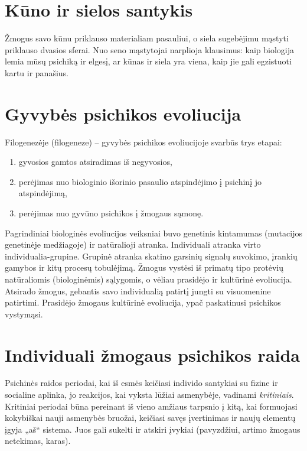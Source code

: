 \section{Kūno ir sielos santykis}

\label{tema:kuno_sielos_santykis}

Žmogus savo kūnu priklauso materialiam pasauliui, o siela sugebėjimu mąstyti
priklauso dvasios sferai. Nuo seno mąstytojai narplioja klausimus: kaip 
biologija lemia mūsų psichiką ir elgesį, ar kūnas ir siela yra viena, kaip 
jie gali egzistuoti kartu ir panašius.

\section{Gyvybės psichikos evoliucija}

\label{tema:gyvybes_psichikos_evoliucija}

Filogenezėje (\gls{filogeneze}) – gyvybės psichikos evoliucijoje svarbūs 
trys etapai: 
\begin{enumerate}
  \item gyvosios gamtos atsiradimas iš negyvosios,
  \item perėjimas nuo biologinio išorinio pasaulio atspindėjimo į psichinį 
    jo atspindėjimą,
  \item perėjimas nuo gyvūno psichikos į žmogaus sąmonę.
\end{enumerate}

Pagrindiniai biologinės evoliucijos veiksniai buvo genetinis kintamumas
(mutacijos genetinėje medžiagoje) ir natūralioji atranka. Individuali 
atranka virto individualia-grupine. Grupinė atranka skatino garsinių signalų
suvokimo, įrankių gamybos ir kitų procesų tobulėjimą. Žmogus vystėsi iš 
primatų tipo protėvių natūraliomis (biologinėmis) sąlygomis, o vėliau 
prasidėjo ir kultūrinė evoliucija. Atsirado žmogus, gebantis savo 
individualią patirtį jungti su visuomenine patirtimi. Prasidėjo žmogaus
kultūrinė evoliucija, ypač paskatinusi psichikos vystymąsi.

\section{Individuali žmogaus psichikos raida}

\label{tema:psichikos_raida}

Psichinės raidos periodai, kai iš esmės keičiasi individo santykiai
su fizine ir socialine aplinka, jo reakcijos, kai vyksta lūžiai asmenybėje,
vadinami \emph{kritiniais}. Kritiniai periodai būna pereinant iš vieno 
amžiaus tarpsnio į kitą, kai formuojasi kokybiškai nauji asmenybės 
bruožai, keičiasi savęs įvertinimas ir naujų elementų įgyja „aš“ sistema.
Juos gali sukelti ir atskiri įvykiai (pavyzdžiui, artimo žmogaus netekimas, 
karas).

